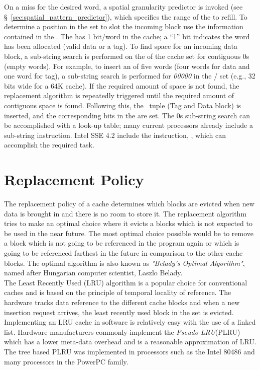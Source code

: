 On a miss for the desired word, a spatial granularity predictor is invoked (see \S~\ref{sec:spatial_pattern_predictor}), which specifies the range of the \AB{} to refill. To determine a position in the set to slot the incoming block use the information contained in the . The  has 1 bit/word in the cache; a ``1'' bit indicates the word has been allocated (valid data or a tag). To find space for an incoming data block, a sub-string search is performed on the  of the cache set for contiguous 0s (empty words). For example, to insert an \AB{} of five words (four words for data and one word for tag), a sub-string search is performed for \textit{00000} in the  / set (e.g., 32 bits wide for a 64K cache). If the required amount of space is not found, the replacement algorithm is repeatedly triggered until the required amount of contiguous space is found. Following this, the \AB\ tuple (Tag and Data block) is inserted, and the corresponding bits in the  are set. The 0s sub-string search can be accomplished with a look-up table; many current processors already include a sub-string instruction. Intel SSE 4.2 include the instruction, , which can accomplish the required task.

\section{Replacement Policy}
\label{sec:replacement_policy}
The replacement policy of a cache determines which blocks are evicted when new data is brought in and there is no room to store it. The replacement algorithm tries to make an optimal choice where it evicts a blocks which is not expected to be used in the near future. The most optimal choice possible would be to remove a block which is not going to be referenced in the program again or which is going to be referenced farthest in the future in comparison to the other cache blocks. The optimal algorithm is also known as \textit{"Belady's Optimal Algorithm"}, named after Hungarian computer scientist, Laszlo Belady.
\\

The Least Recently Used (LRU) algorithm is a popular choice for conventional caches and is based on the principle of temporal locality of reference. The hardware tracks data reference to the different cache blocks and when a new insertion request arrives, the least recently used block in the set is evicted. Implementing an LRU cache in software is relatively easy with the use of a linked list. Hardware manufacturers commonly implement the \textit{Pseudo-LRU}(PLRU) which has a lower meta-data overhead and is a reasonable approximation of LRU. The tree based PLRU was implemented in processors such as the Intel 80486 and many processors in the PowerPC family. 

